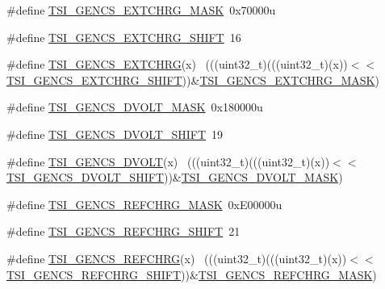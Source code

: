 \begin{DoxyCompactItemize}
\item 
\#define \hyperlink{group___t_s_i___register___masks_ga14b70379252ea633e8c97c1ab13553c6}{T\+S\+I\+\_\+\+G\+E\+N\+C\+S\+\_\+\+E\+X\+T\+C\+H\+R\+G\+\_\+\+M\+A\+SK}~0x70000u
\item 
\#define \hyperlink{group___t_s_i___register___masks_gaf6315fa37479b4e49a6f3252a451352b}{T\+S\+I\+\_\+\+G\+E\+N\+C\+S\+\_\+\+E\+X\+T\+C\+H\+R\+G\+\_\+\+S\+H\+I\+FT}~16
\item 
\#define \hyperlink{group___t_s_i___register___masks_ga1773fdc3f91b98af2f775331c7f59a7a}{T\+S\+I\+\_\+\+G\+E\+N\+C\+S\+\_\+\+E\+X\+T\+C\+H\+RG}(x)                                      ~(((uint32\+\_\+t)(((uint32\+\_\+t)(x))$<$$<$\hyperlink{group___t_s_i___register___masks_gaf6315fa37479b4e49a6f3252a451352b}{T\+S\+I\+\_\+\+G\+E\+N\+C\+S\+\_\+\+E\+X\+T\+C\+H\+R\+G\+\_\+\+S\+H\+I\+FT}))\&\hyperlink{group___t_s_i___register___masks_ga14b70379252ea633e8c97c1ab13553c6}{T\+S\+I\+\_\+\+G\+E\+N\+C\+S\+\_\+\+E\+X\+T\+C\+H\+R\+G\+\_\+\+M\+A\+SK})
\item 
\#define \hyperlink{group___t_s_i___register___masks_ga5f993b291aa5098c00c7ca603d76fa8c}{T\+S\+I\+\_\+\+G\+E\+N\+C\+S\+\_\+\+D\+V\+O\+L\+T\+\_\+\+M\+A\+SK}~0x180000u
\item 
\#define \hyperlink{group___t_s_i___register___masks_gabef14bd85b2c22b59a963796a510d2aa}{T\+S\+I\+\_\+\+G\+E\+N\+C\+S\+\_\+\+D\+V\+O\+L\+T\+\_\+\+S\+H\+I\+FT}~19
\item 
\#define \hyperlink{group___t_s_i___register___masks_ga82be7f8d184e5f97a4e2f1aca3c9da70}{T\+S\+I\+\_\+\+G\+E\+N\+C\+S\+\_\+\+D\+V\+O\+LT}(x)                                          ~(((uint32\+\_\+t)(((uint32\+\_\+t)(x))$<$$<$\hyperlink{group___t_s_i___register___masks_gabef14bd85b2c22b59a963796a510d2aa}{T\+S\+I\+\_\+\+G\+E\+N\+C\+S\+\_\+\+D\+V\+O\+L\+T\+\_\+\+S\+H\+I\+FT}))\&\hyperlink{group___t_s_i___register___masks_ga5f993b291aa5098c00c7ca603d76fa8c}{T\+S\+I\+\_\+\+G\+E\+N\+C\+S\+\_\+\+D\+V\+O\+L\+T\+\_\+\+M\+A\+SK})
\item 
\#define \hyperlink{group___t_s_i___register___masks_ga497b1a716e54da9ae1f89fe866c9dfec}{T\+S\+I\+\_\+\+G\+E\+N\+C\+S\+\_\+\+R\+E\+F\+C\+H\+R\+G\+\_\+\+M\+A\+SK}~0x\+E00000u
\item 
\#define \hyperlink{group___t_s_i___register___masks_ga53636ad4be1c8098f9475103fdc056e2}{T\+S\+I\+\_\+\+G\+E\+N\+C\+S\+\_\+\+R\+E\+F\+C\+H\+R\+G\+\_\+\+S\+H\+I\+FT}~21
\item 
\#define \hyperlink{group___t_s_i___register___masks_gafa86002397a847f601ec063b2a455c8a}{T\+S\+I\+\_\+\+G\+E\+N\+C\+S\+\_\+\+R\+E\+F\+C\+H\+RG}(x)                                      ~(((uint32\+\_\+t)(((uint32\+\_\+t)(x))$<$$<$\hyperlink{group___t_s_i___register___masks_ga53636ad4be1c8098f9475103fdc056e2}{T\+S\+I\+\_\+\+G\+E\+N\+C\+S\+\_\+\+R\+E\+F\+C\+H\+R\+G\+\_\+\+S\+H\+I\+FT}))\&\hyperlink{group___t_s_i___register___masks_ga497b1a716e54da9ae1f89fe866c9dfec}{T\+S\+I\+\_\+\+G\+E\+N\+C\+S\+\_\+\+R\+E\+F\+C\+H\+R\+G\+\_\+\+M\+A\+SK})
$$
\end{DoxyCompactItemize}
